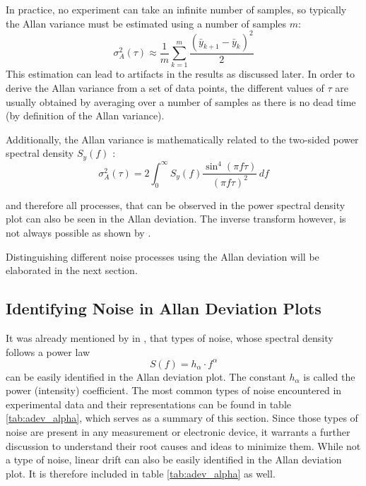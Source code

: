 In practice, no experiment can take an infinite number of samples, so typically the Allan variance must be estimated using a number of samples $m$:
\begin{equation}
    \sigma_A^2(\tau) \approx \frac1 m \sum_{k=1}^m \frac{\left(\bar y_{k+1} - \bar y_{k} \right)^2}{2} \label{eqn:adev_estimator}
\end{equation}
This estimation can lead to artifacts in the results as discussed later. In order to derive the Allan variance from a set of data points, the different values of $\tau$ are usually obtained by averaging over a number of samples as there is no dead time (by definition of the Allan variance).

Additionally, the Allan variance is mathematically related to the two-sided power spectral density $S_y(f)$ \cite{psd_to_adev}:
\begin{equation}
    \sigma_A^2(\tau) = 2 \int_0^\infty S_y(f) \frac{\sin^4\left( \pi f \tau \right)}{(\pi f \tau)^2}\,df \label{eqn:psd_to_adev}
\end{equation}

and therefore all processes, that can be observed in the power spectral density plot can also be seen in the Allan deviation. The inverse transform however, is not always possible as shown by \citeauthor{inverse_adev} \cite{inverse_adev}.

Distinguishing different noise processes using the Allan deviation will be elaborated in the next section.

\subsection{Identifying Noise in Allan Deviation Plots}
It was already mentioned by \citeauthor{adev} in \cite{adev}, that types of noise, whose spectral density follows a power law
\begin{equation}
    S(f) = h_{\alpha} \cdot f^\alpha \label{eqn:power_law}
\end{equation}
can be easily identified in the Allan deviation plot. The constant $h_\alpha$ is called the power (intensity) coefficient. The most common types of noise encountered in experimental data and their representations can be found in table \ref{tab:adev_alpha}, which serves as a summary of this section. Since those types of noise are present in any measurement or electronic device, it warrants a further discussion to understand their root causes and ideas to minimize them. While not a type of noise, linear drift can also be easily identified in the Allan deviation plot. It is therefore included in table \ref{tab:adev_alpha} as well.

